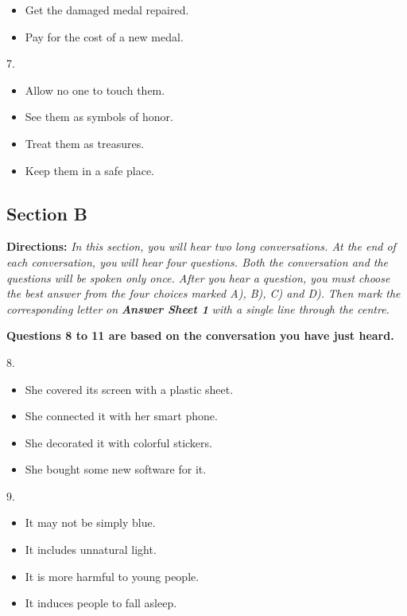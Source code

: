 \documentclass[UTF8,11pt]{ctexart}
\begin{document}
\begin{itemize}[leftmargin=2em,itemsep=.2em,topsep=.4em]\item[C.] Get the damaged medal repaired.
\item[D.] Pay for the cost of a new medal.
\end{itemize}

7.


\begin{itemize}[leftmargin=2em,itemsep=.2em,topsep=.4em]\item[A.] Allow no one to touch them.
\item[B.] See them as symbols of honor.
\item[C.] Treat them as treasures.
\item[D.] Keep them in a safe place.
\end{itemize}

\subsection*{\textbf{Section B}}


\textbf{Directions:} \textit{In this section, you will hear two long conversations. At the end of each conversation, you} \textit{will hear four questions. Both the conversation and the questions will be spoken only once. After you} \textit{hear a question, you must choose the best answer from the four choices marked A), B), C) and D).} \textit{Then mark the corresponding letter on }\textbf{\textit{Answer Sheet 1}}\textit{ with a single line through the centre.}


\textbf{Questions 8 to 11 are based on the conversation you have just heard.}


8.


\begin{itemize}[leftmargin=2em,itemsep=.2em,topsep=.4em]\item[A.] She covered its screen with a plastic sheet.
\item[B.] She connected it with her smart phone.
\item[C.] She decorated it with colorful stickers.
\item[D.] She bought some new software for it.
\end{itemize}

9.


\begin{itemize}[leftmargin=2em,itemsep=.2em,topsep=.4em]\item[A.] It may not be simply blue.
\item[B.] It includes unnatural light.
\item[C.] It is more harmful to young people.
\item[D.] It induces people to fall asleep.
\end{itemize}
\end{document}
